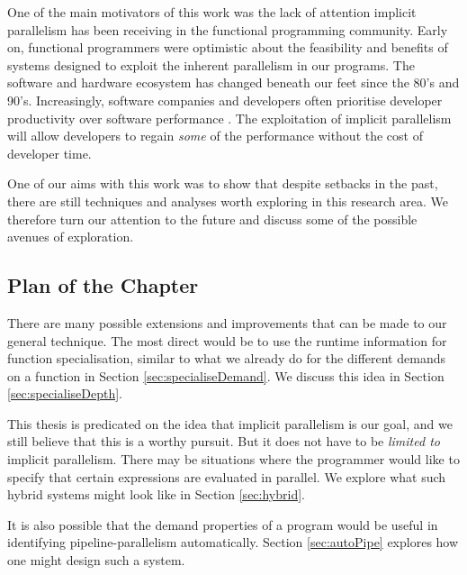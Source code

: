 One of the main motivators of this work was the lack of attention implicit
parallelism has been receiving in the functional programming community.  Early
on, functional programmers were optimistic about the feasibility and benefits
of systems designed to exploit the inherent parallelism in our programs.  The
software and hardware ecosystem has changed beneath our feet since the 80's and
90's. Increasingly, software companies and developers often prioritise
developer productivity over software performance \citep{codingHorror}. The
exploitation of implicit parallelism will allow developers to regain
\emph{some} of the performance without the cost of developer time.

One of our aims with this work was to show that despite setbacks in the
past, there are still techniques and analyses worth exploring in this
research area.  We therefore turn our attention to the future and discuss some
of the possible avenues of exploration.

\subsection*{Plan of the Chapter}

There are many possible extensions and improvements that can be made to our
general technique. The most direct would be to use the runtime information for
function specialisation, similar to what we already do for the different
demands on a function in Section \ref{sec:specialiseDemand}. We discuss this
idea in Section \ref{sec:specialiseDepth}.

This thesis is predicated on the idea that implicit parallelism is our goal,
and we still believe that this is a worthy pursuit. But it does not have to be
\emph{limited to} implicit parallelism. There may be situations where the programmer
would like to specify that certain expressions are evaluated in parallel. We
explore what such hybrid systems might look like in Section \ref{sec:hybrid}.

It is also possible that the demand properties of a program would be useful in
identifying pipeline-parallelism automatically. Section \ref{sec:autoPipe}
explores how one might design such a system. 
